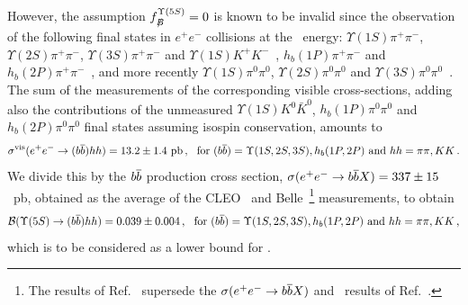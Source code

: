 However, the assumption $f^{\Upsilon(5S)}_{B\!\!\!\!/}=0$ is known to be invalid since the observation of
the following final states in $e^+e^-$ collisions at the \Upsfive\ energy:
$\Upsilon(1S)\pi^+\pi^-$,
$\Upsilon(2S)\pi^+\pi^-$,
$\Upsilon(3S)\pi^+\pi^-$
and
$\Upsilon(1S)K^+K^-$~\cite{Abe:2007tk,Garmash:2014dhx_mod},
$h_b(1P)\pi^+\pi^-$ and 
$h_b(2P)\pi^+\pi^-$~\cite{Adachi:2011ji},
and more recently 
$\Upsilon(1S)\pi^0\pi^0$,
$\Upsilon(2S)\pi^0\pi^0$ 
and
$\Upsilon(3S)\pi^0\pi^0$~\cite{Krokovny:2013mgx}.
The sum of the measurements of the corresponding visible cross-sections,
adding also the contributions of the unmeasured
$\Upsilon(1S)K^0\bar{K}^0$, $h_b(1P)\pi^0\pi^0$ and $h_b(2P)\pi^0\pi^0$ final states
assuming isospin conservation, amounts to
$$
\sigma^{\rm vis}(e^+e^-\to (\b\bar{\b})hh) = 13.2\pm1.4~{\rm pb} \,,
~~\mbox{for $(\b\bar{\b})=\Upsilon(1S,2S,3S),h_b(1P,2P)$ and $hh=\pi\pi,KK$}\,.
$$
We divide this by the $\b\bar{\b}$ production cross section, 
$\sigma(e^+e^- \to \b\bar{\b} X) = 337 \pm 15$~pb, obtained as the average of the 
CLEO~\cite{Artuso:2005xw} and Belle~\cite{Esen:2012yz}\footnote{%
\label{foot:life_mix:Esen:2012yz}
The results of Ref.~\cite{Esen:2012yz} supersede the $\sigma(e^+e^- \to \b\bar{\b} X)$ and \fsfive\ results of Ref.~\cite{Drutskoy:2006fg}.
} measurements, to obtain
$$
{\cal B}(\Upsfive\to (\b\bar{\b})hh) = 0.039\pm0.004 \,,
~~\mbox{for $(\b\bar{\b})=\Upsilon(1S,2S,3S),h_b(1P,2P)$ and $hh=\pi\pi,KK$}\,,
$$
which is to be considered as a lower bound for \fnBfive. 



